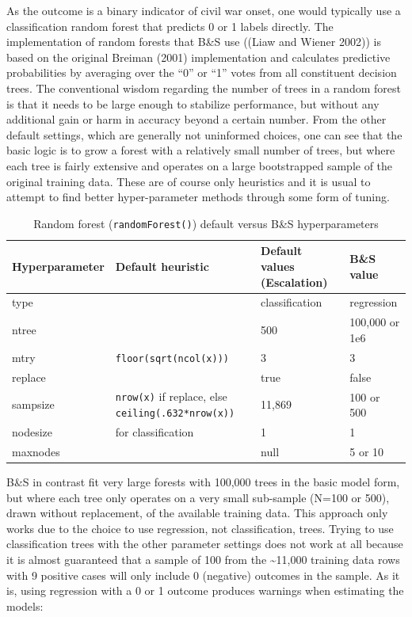 \documentclass[
]{article}
\begin{document}
As the outcome is a binary indicator of civil war onset, one would typically use a classification random forest that predicts 0 or 1 labels directly. The implementation of random forests that B\&S use ((Liaw and Wiener 2002)) is based on the original Breiman (2001) implementation and calculates predictive probabilities by averaging over the ``0'' or ``1'' votes from all constituent decision trees. The conventional wisdom regarding the number of trees in a random forest is that it needs to be large enough to stabilize performance, but without any additional gain or harm in accuracy beyond a certain number. From the other default settings, which are generally not uninformed choices, one can see that the basic logic is to grow a forest with a relatively small number of trees, but where each tree is fairly extensive and operates on a large bootstrapped sample of the original training data. These are of course only heuristics and it is usual to attempt to find better hyper-parameter methods through some form of tuning.

\begin{table}
\caption{\label{tab:hp} Random forest (\texttt{randomForest()}) default versus B\&S hyperparameters}
\begin{tabular}{l>{\raggedright\arraybackslash}p{2in}ll}
\toprule
Hyperparameter & Default heuristic & Default values (Escalation) & B\&S value \\
\midrule
type & & classification & regression \\
ntree & & 500 & 100,000 or 1e6 \\
mtry & \texttt{floor(sqrt(ncol(x)))} & 3 & 3 \\
replace & & true & false \\
sampsize & \texttt{nrow(x)} if replace, else \texttt{ceiling(.632*nrow(x))} & 11,869 & 100 or
500 \\
nodesize & 1 for classification & 1 & 1 \\
maxnodes & & null & 5 or 10 \\
\bottomrule
\end{tabular}
\end{table}

B\&S in contrast fit very large forests with 100,000 trees in the basic model form, but where each tree only operates on a very small sub-sample (N=100 or 500), drawn without replacement, of the available training data. This approach only works due to the choice to use regression, not classification, trees. Trying to use classification trees with the other parameter settings does not work at all because it is almost guaranteed that a sample of 100 from the \textasciitilde11,000 training data rows with 9 positive cases will only include 0 (negative) outcomes in the sample. As it is, using regression with a 0 or 1 outcome produces warnings when estimating the models:
\end{document}
